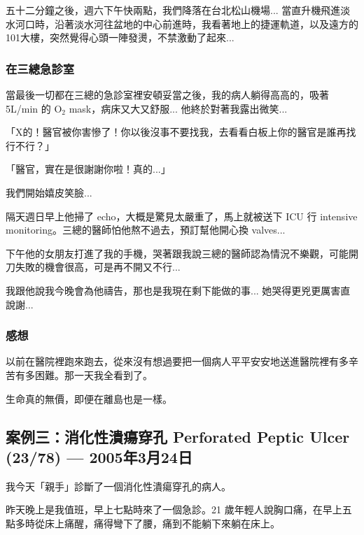 \documentclass[12pt,a4paper]{article}
\newenvironment{myquote}{%
    \begin{tcolorbox}[
        colback=quote_bg,
        colframe=emergency_gray,
        boxrule=0pt,
        leftrule=3pt,
        arc=0pt,
        left=10pt,
        right=10pt,
        top=8pt,
        bottom=8pt
    ]
    \itshape
}{%
    \end{tcolorbox}
}
\begin{document}
五十二分鐘之後，週六下午快兩點，我們降落在台北松山機場... 當直升機飛進淡水河口時，沿著淡水河往盆地的中心前進時，我看著地上的捷運軌道，以及遠方的101大樓，突然覺得心頭一陣發燙，不禁激動了起來...

\subsubsection{在三總急診室}

當最後一切都在三總的急診室裡安頓妥當之後，我的病人躺得高高的，吸著 5L/min 的 O$_2$ mask，病床又大又舒服... 他終於對著我露出微笑...

\begin{myquote}
「X的！醫官被你害慘了！你以後沒事不要找我，去看看白板上你的醫官是誰再找行不行？」

「醫官，實在是很謝謝你啦！真的...」
\end{myquote}

我們開始嬉皮笑臉...

隔天週日早上他掃了 echo，大概是驚見太嚴重了，馬上就被送下 ICU 行 intensive monitoring。三總的醫師怕他熬不過去，預訂幫他開心換 valves...

下午他的女朋友打進了我的手機，哭著跟我說三總的醫師認為情況不樂觀，可能開刀失敗的機會很高，可是再不開又不行...

\begin{myquote}
我跟他說我今晚會為他禱告，那也是我現在剩下能做的事... 她哭得更兇更厲害直說謝...
\end{myquote}

\subsubsection{感想}

以前在醫院裡跑來跑去，從來沒有想過要把一個病人平平安安地送進醫院裡有多辛苦有多困難。那一天我全看到了。

\begin{myquote}
生命真的無價，即便在離島也是一樣。
\end{myquote}

\subsection{案例三：消化性潰瘍穿孔 Perforated Peptic Ulcer (23/78) — 2005年3月24日}

我今天「親手」診斷了一個消化性潰瘍穿孔的病人。

昨天晚上是我值班，早上七點時來了一個急診。21 歲年輕人說胸口痛，在早上五點多時從床上痛醒，痛得彎下了腰，痛到不能躺下來躺在床上。
\end{document}
